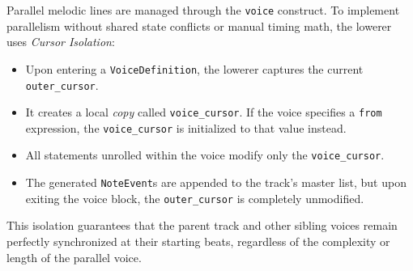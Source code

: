 Parallel melodic lines are managed through the \texttt{voice} construct.
To implement parallelism without shared state conflicts or manual timing math, the lowerer uses
\textit{Cursor Isolation}:
\begin{itemize}
  \item Upon entering a \texttt{VoiceDefinition}, the lowerer captures the current \texttt{outer\_cursor}.
  \item It creates a local \textit{copy} called \texttt{voice\_cursor}.
    If the voice specifies a \texttt{from} expression, the \texttt{voice\_cursor} is initialized to that value instead.
  \item All statements unrolled within the voice modify only the \texttt{voice\_cursor}.
  \item The generated \texttt{NoteEvent}s are appended to the track's master list, but upon exiting the voice block, the
    \texttt{outer\_cursor} is completely unmodified.
\end{itemize}
This isolation guarantees that the parent track and other sibling voices remain perfectly synchronized at their starting
beats, regardless of the complexity or length of the parallel voice.
